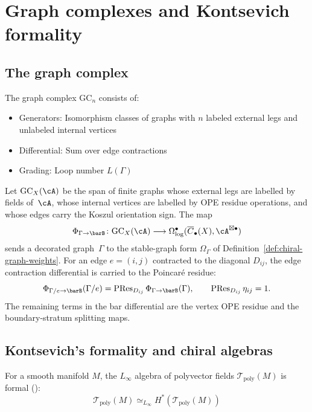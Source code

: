 \section{Graph complexes and Kontsevich formality}

\subsection{The graph complex}

\begin{definition}
The graph complex $\text{GC}_n$ consists of:
\begin{itemize}
\item Generators: Isomorphism classes of graphs with $n$ labeled external legs
and unlabeled internal vertices
\item Differential: Sum over edge contractions
\item Grading: Loop number $L(\Gamma)$
\end{itemize}
\end{definition}

\begin{definition}
\label{def:bar-graph-map}
Let \(\mathrm{GC}_X(\cA)\) be the span of finite graphs whose external
legs are labelled by fields of~\(\cA\), whose internal vertices are
labelled by OPE residue operations, and whose edges carry the Koszul
orientation sign.  The map
\[
\Phi_{\Gamma\to\barB}\colon \mathrm{GC}_X(\cA)\longrightarrow
\Omega^\bullet_{\log}(\overline{C}_\bullet(X),\cA^{\boxtimes \bullet})
\]
sends a decorated graph~\(\Gamma\) to the stable-graph form
\(\Omega_\Gamma\) of Definition~\ref{def:chiral-graph-weights}.  For an
edge \(e=(i,j)\) contracted to the diagonal \(D_{ij}\), the edge
contraction differential is carried to the Poincar\'e residue:
\[
\Phi_{\Gamma/e\to\barB}(\Gamma/e)
=\operatorname{PRes}_{D_{ij}}\Phi_{\Gamma\to\barB}(\Gamma),
\qquad
\operatorname{PRes}_{D_{ij}}\eta_{ij}=1.
\]
The remaining terms in the bar differential are the vertex OPE residue
and the boundary-stratum splitting maps.
\end{definition}

\subsection{Kontsevich's formality and chiral algebras}

\begin{theorem}
\label{thm:kontsevich-formality-feynman}
For a smooth manifold $M$, the $L_\infty$ algebra of polyvector fields
$\mathcal{T}_{\text{poly}}(M)$ is formal (\cite{Kon03}):
\[\mathcal{T}_{\text{poly}}(M) \simeq_{L_\infty} H^*(\mathcal{T}_{\text{poly}}(M))\]
\end{theorem}

